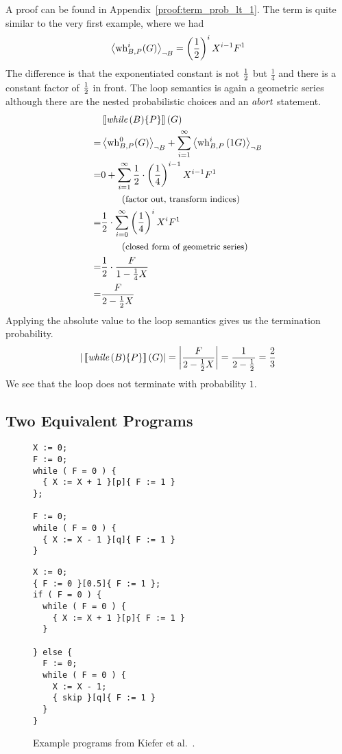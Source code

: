 A proof can be found in Appendix~\ref{proof:term_prob_lt_1}.
The term is quite similar to the very first example, where we had
\[ \left\langle \operatorname{wh}_{B, P}^i(G) \right\rangle_{\lnot B} = \left( \frac{1}{2} \right)^i X^{i-1} F^1  \]
The difference is that the exponentiated constant is not $\frac{1}{2}$ but $\frac{1}{4}$ and there is a constant factor of $\frac{1}{2}$ in front.
The loop semantics is again a geometric series although there are the nested probabilistic choices and an $\textit{abort}$ statement.
\begin{align*}
	 & \left\llbracket \textit{while}\,(B) \{P\} \right\rrbracket(G) \\
	=& \left\langle \operatorname{wh}_{B, P}^0(G) \right\rangle_{\lnot B} + \sum_{i = 1}^{\infty} \left\langle \operatorname{wh}_{B, P}^i \left(1G\right) \right\rangle_{\lnot B} \\
	=& 0 + \sum_{i = 1}^{\infty} \frac{1}{2} \cdot \left(\frac{1}{4}\right)^{i-1} X^{i-1} F^1 \\
	 & \hspace*{2em} \left(\text{\small factor out, transform indices}\right) \\
	=& \frac{1}{2} \cdot \sum_{i = 0}^{\infty} \left(\frac{1}{4}\right)^i X^i F^1 \\
	 & \hspace*{2em} \left(\text{\small closed form of geometric series}\right) \\
	=& \frac{1}{2} \cdot \frac{F}{1 - \frac{1}{4} X} \\
	=& \frac{F}{2 - \frac{1}{2} X} \\
\end{align*}
Applying the absolute value to the loop semantics gives us the termination probability.
\[ |\left\llbracket \textit{while}\,(B) \{P\} \right\rrbracket(G)| = \left|\frac{F}{2 - \frac{1}{2} X}\right|
	= \frac{1}{2 - \frac{1}{2}} = \frac{2}{3} \]
We see that the loop does not terminate with probability $1$.

\subsection{Two Equivalent Programs}

\begin{figure}[t]
	\begin{minipage}[t]{0.5\textwidth}
		\begin{lstlisting}[caption=Consecutive loops.]
X := 0;
F := 0;
while ( F = 0 ) {
  { X := X + 1 }[p]{ F := 1 }
};

F := 0;
while ( F = 0 ) {
  { X := X - 1 }[q]{ F := 1 }
}
		\end{lstlisting}
	\end{minipage}
	\begin{minipage}[t]{0.5\textwidth}
		\begin{lstlisting}[caption=Separated loops.]
X := 0;
{ F := 0 }[0.5]{ F := 1 };
if ( F = 0 ) {
  while ( F = 0 ) {
    { X := X + 1 }[p]{ F := 1 }
  }

} else {
  F := 0;
  while ( F = 0 ) {
    X := X - 1;
    { skip }[q]{ F := 1 }
  }
}
		\end{lstlisting}
	\end{minipage}
	\caption{Example programs from Kiefer et al.~\cite{kiefer:equivalent_programs}.
	\label{fig:equivalent_progs}}
\end{figure}

